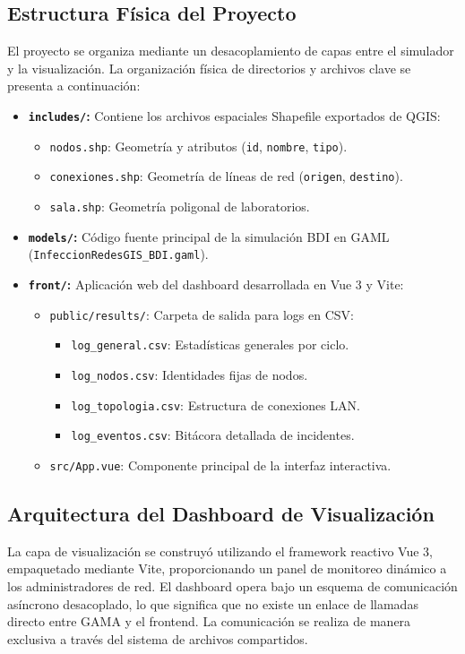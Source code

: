 \subsection{Estructura Física del Proyecto}
El proyecto se organiza mediante un desacoplamiento de capas entre el simulador y la visualización. La organización física de directorios y archivos clave se presenta a continuación:
\begin{itemize}
    \item \textbf{\texttt{includes/}:} Contiene los archivos espaciales Shapefile exportados de QGIS:
    \begin{itemize}
        \item \texttt{nodos.shp}: Geometría y atributos (\texttt{id}, \texttt{nombre}, \texttt{tipo}).
        \item \texttt{conexiones.shp}: Geometría de líneas de red (\texttt{origen}, \texttt{destino}).
        \item \texttt{sala.shp}: Geometría poligonal de laboratorios.
    \end{itemize}
    \item \textbf{\texttt{models/}:} Código fuente principal de la simulación BDI en GAML (\texttt{Infeccion\allowbreak Redes\allowbreak GIS\_\allowbreak BDI.\allowbreak gaml}).
    \item \textbf{\texttt{front/}:} Aplicación web del dashboard desarrollada en Vue 3 y Vite:
    \begin{itemize}
        \item \texttt{public/results/}: Carpeta de salida para logs en CSV:
        \begin{itemize}
            \item \texttt{log\_general.csv}: Estadísticas generales por ciclo.
            \item \texttt{log\_nodos.csv}: Identidades fijas de nodos.
            \item \texttt{log\_topologia.csv}: Estructura de conexiones LAN.
            \item \texttt{log\_eventos.csv}: Bitácora detallada de incidentes.
        \end{itemize}
        \item \texttt{src/App.vue}: Componente principal de la interfaz interactiva.
    \end{itemize}
\end{itemize}

\subsection{Arquitectura del Dashboard de Visualización}
La capa de visualización se construyó utilizando el framework reactivo Vue 3, empaquetado mediante Vite, proporcionando un panel de monitoreo dinámico a los administradores de red. El dashboard opera bajo un esquema de comunicación asíncrono desacoplado, lo que significa que no existe un enlace de llamadas directo entre GAMA y el frontend. La comunicación se realiza de manera exclusiva a través del sistema de archivos compartidos.

